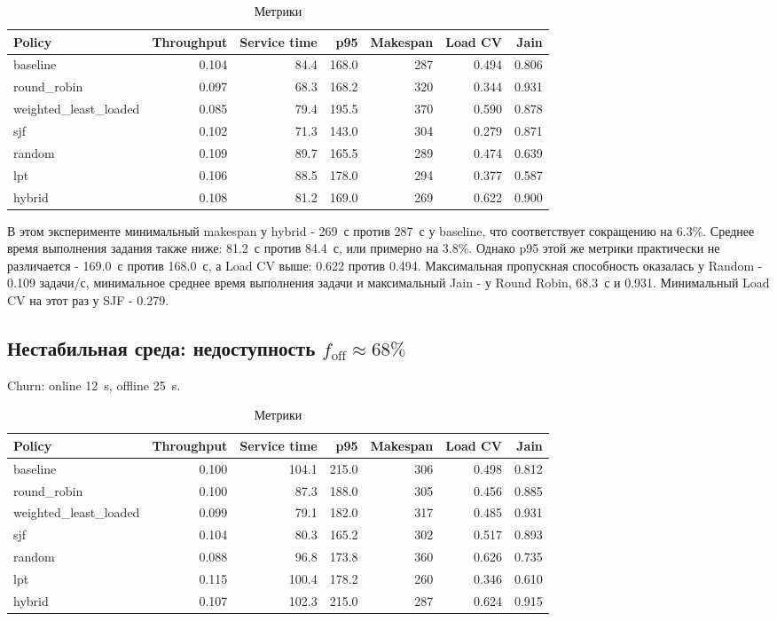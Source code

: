 \documentclass[a4paper,12pt]{extarticle}
\begin{document}
\begin{table}[H]
\centering
    \caption{Метрики}
\footnotesize
\begin{tabular}{lrrrrrr}
\toprule
Policy & Throughput & Service time & p95 & Makespan & Load CV & Jain \\
\midrule
    baseline & 0.104 & 84.4 & 168.0 & 287 & 0.494 & 0.806 \\
    round\_robin & 0.097 & 68.3 & 168.2 & 320 & 0.344 & 0.931 \\
    weighted\_least\_loaded & 0.085 & 79.4 & 195.5 & 370 & 0.590 & 0.878 \\
    sjf & 0.102 & 71.3 & 143.0 & 304 & 0.279 & 0.871 \\
    random & 0.109 & 89.7 & 165.5 & 289 & 0.474 & 0.639 \\
    lpt & 0.106 & 88.5 & 178.0 & 294 & 0.377 & 0.587 \\
    hybrid & 0.108 & 81.2 & 169.0 & 269 & 0.622 & 0.900 \\
\bottomrule
\end{tabular}
\end{table}

В этом эксперименте минимальный makespan у hybrid - 269~с против 287~с у baseline, что соответствует сокращению на 6.3\%. Среднее время выполнения задания также ниже: 81.2~с против 84.4~с, или примерно на 3.8\%. Однако p95 этой же метрики практически не различается - 169.0~с против 168.0~с, а Load CV выше: 0.622 против 0.494. Максимальная пропускная способность оказалась у Random - 0.109 задачи/с, минимальное среднее время выполнения задачи и максимальный Jain - у Round Robin, 68.3~с и 0.931. Минимальный Load CV на этот раз у SJF - 0.279.

\subsection{Нестабильная среда: недоступность $f_{\text{off}}\approx 68\%$}
Churn: online 12~s, offline 25~s.

\begin{table}[H]
\centering
    \caption{Метрики}
\footnotesize
\begin{tabular}{lrrrrrr}
\toprule
Policy & Throughput & Service time & p95 & Makespan & Load CV & Jain \\
\midrule
    baseline & 0.100 & 104.1 & 215.0 & 306 & 0.498 & 0.812 \\
    round\_robin & 0.100 & 87.3 & 188.0 & 305 & 0.456 & 0.885 \\
    weighted\_least\_loaded & 0.099 & 79.1 & 182.0 & 317 & 0.485 & 0.931 \\
    sjf & 0.104 & 80.3 & 165.2 & 302 & 0.517 & 0.893 \\
    random & 0.088 & 96.8 & 173.8 & 360 & 0.626 & 0.735 \\
    lpt & 0.115 & 100.4 & 178.2 & 260 & 0.346 & 0.610 \\
    hybrid & 0.107 & 102.3 & 215.0 & 287 & 0.624 & 0.915 \\
\bottomrule
\end{tabular}
\end{table}
\end{document}
